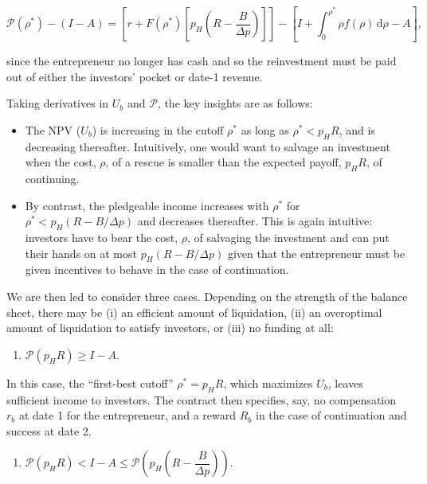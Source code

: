 \documentclass[11pt,a4paper]{article}
\providecommand{\tightlist}{\setlength{\itemsep}{0pt}\setlength{\parskip}{0pt}}
\begin{document}
\[\mathcal{P}(\rho^*) - (I - A) = \left[r + F(\rho^*)\left[p_H\left(R - \frac{B}{\Delta p}\right)\right]\right] - \left[I + \int_0^{\rho^*}\rho f(\rho)\,\mathrm{d}\rho - A\right],\]

since the entrepreneur no longer has cash and so the reinvestment must be paid out of either the
investors' pocket or date-1 revenue.

Taking derivatives in \(U_b\) and \(\mathcal{P}\), the key insights are as follows:

\begin{itemize}
\tightlist
\item
  The NPV (\(U_b\)) is increasing in the cutoff \(\rho^*\) as long as \(\rho^* < p_HR\), and is
  decreasing thereafter. Intuitively, one would want to salvage an investment when the cost,
  \(\rho\), of a rescue is smaller than the expected payoff, \(p_HR\), of continuing.
\item
  By contrast, the pledgeable income increases with \(\rho^*\) for \(\rho^* < p_H(R - B/\Delta p)\)
  and decreases thereafter. This is again intuitive: investors have to bear the cost, \(\rho\), of
  salvaging the investment and can put their hands on at most \(p_H(R - B/\Delta p)\) given that the
  entrepreneur must be given incentives to behave in the case of continuation.
\end{itemize}

We are then led to consider three cases. Depending on the strength of the balance sheet, there may
be (i) an efficient amount of liquidation, (ii) an overoptimal amount of liquidation to satisfy
investors, or (iii) no funding at all:

\begin{enumerate}
\def\labelenumi{(\roman{enumi})}
\tightlist
\item
  \(\mathcal{P}(p_HR) \geqslant I - A\).
\end{enumerate}

In this case, the ``first-best cutoff'' \(\rho^* = p_HR\), which maximizes \(U_b\), leaves
sufficient income to investors. The contract then specifies, say, no compensation \(r_b\) at date 1
for the entrepreneur, and a reward \(R_b\) in the case of continuation and success at date 2.

\begin{enumerate}
\def\labelenumi{(\roman{enumi})}
\setcounter{enumi}{1}
\tightlist
\item
  \(\mathcal{P}(p_HR) < I - A \leqslant \mathcal{P}\left(p_H\left(R - \dfrac{B}{\Delta p}\right)\right)\).
\end{enumerate}
\end{document}
